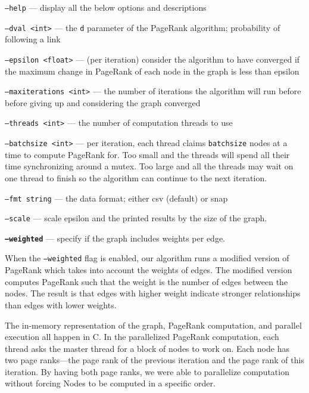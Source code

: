 \documentclass{report}
\newcommand{\pagerank}{PageRank }
\begin{document}
\begin{list}{}{}
  \item \texttt{--help} --- display all the below options and descriptions
  \item \texttt{--dval <int>} --- the \texttt{d} parameter of the \pagerank
  algorithm; probability of following a link
  \item \texttt{--epsilon <float>} --- (per iteration) consider the algorithm to
  have converged if the maximum change in \pagerank of each node in the graph is
  less than epsilon
  \item \texttt{--maxiterations <int>} --- the number of iterations the algorithm
  will run before before giving up and considering the graph converged
  \item \texttt{--threads <int>} --- the number of computation threads to use
  \item \texttt{--batchsize <int>} --- per iteration, each thread claims
  \texttt{batchsize} nodes at a time to compute \pagerank for. Too small and the
  threads will spend all their time synchronizing around a mutex. Too large and
  all the threads may wait on one thread to finish so the algorithm can continue
  to the next iteration.
  \item \texttt{--fmt string} --- the data format; either csv (default) or snap
  \item \texttt{--scale} --- scale epsilon and the printed results by the size of
  the graph.
  \item \textbf{\texttt{--weighted}} --- specify if the graph includes weights per
  edge.
\end{list}

When the \texttt{--weighted} flag is enabled, our algorithm runs a modified
version of \pagerank which takes into account the weights of edges. The modified
version computes \pagerank such that the weight is the number of edges between
the nodes. The result is that edges with higher weight indicate stronger
relationships than edges with lower weights.

The in-memory representation of the graph, \pagerank computation, and parallel
execution all happen in C. In the parallelized \pagerank computation, each thread
asks the master thread for a block of nodes to work on. Each node has two page
ranks---the page rank of the previous iteration and the page rank of this
iteration.  By having both page ranks, we were able to parallelize computation
without forcing Nodes to be computed in a specific order.
\end{document}
